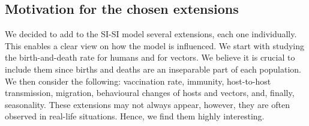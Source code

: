 \subsection{Motivation for the chosen extensions}
We decided to add to the SI-SI model several extensions, each one individually. This enables a clear view on how the model is influenced. We start with studying the birth-and-death rate for humans and for vectors. We believe it is crucial to include them since births and deaths are an inseparable part of each population. We then consider the following: vaccination rate, immunity, host-to-host transmission, migration, behavioural changes of hosts and vectors, and, finally, seasonality. These extensions may not always appear, however, they are often observed in real-life situations. Hence, we find them highly interesting.

